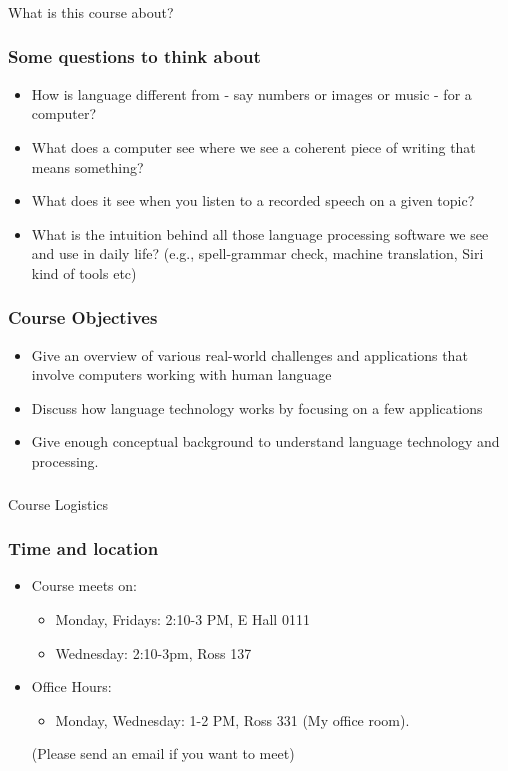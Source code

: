 \documentclass{beamer}
\begin{document}

\begin{frame}
\frametitle{}
\begin{center}
\Large What is this course about?
\end{center}
\end{frame}

\begin{frame}
\frametitle{Some questions to think about }
\begin{itemize}
\item How is language different from - say numbers or images or music - for a computer?
\item What does a computer see where we see a coherent piece of writing that means something?
\item What does it see when you listen to a recorded speech on a given topic?
\item What is the intuition behind all those language processing software we see and use in daily life? (e.g., spell-grammar check, machine translation, Siri kind of tools etc)
\end{itemize}
\end{frame}

\begin{frame}
\frametitle{Course Objectives}
\begin{itemize}
\item Give an overview of various real-world challenges and applications that involve computers working with human language
\item Discuss how language technology works by focusing on a few applications
\item Give enough conceptual background to understand language technology and processing.
\end{itemize}
\end{frame}

\begin{frame}
\frametitle{}
\begin{center}
Course Logistics
\end{center}
\end{frame}

\begin{frame}
\frametitle{Time and location}
\begin{itemize}
\item Course meets on:
\begin{itemize}\itemsep1ex
\item Monday, Fridays: 2:10-3 PM, E Hall 0111
\item Wednesday: 2:10-3pm, Ross 137
\end{itemize}
\item Office Hours:  
\begin{itemize}\itemsep1ex
\item Monday, Wednesday: 1-2 PM, Ross 331 (My office room).
\end{itemize}
(Please send an email if you want to meet)
\end{itemize}
\end{frame}
\end{document}
